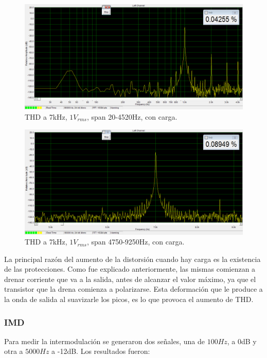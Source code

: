 \begin{figure}[H]
\centering
\includegraphics[width=\textwidth]{img/Distorsion/THD_1k_1V_carga_span_20_4520.png}
\caption{THD a 7kHz, $1V_{rms}$, span 20-4520Hz, con carga.}
\label{THD7} 
\end{figure}

\begin{figure}[H]
\centering
\includegraphics[width=\textwidth]{img/Distorsion/THD_7k_1V_carga_span_4750_9250.png}
\caption{THD a 7kHz, $1V_{rms}$, span 4750-9250Hz, con carga.}
\label{THD8} 
\end{figure}

La principal razón del aumento de la distorsión cuando hay carga es la existencia de las protecciones. Como fue explicado anteriormente, las mismas comienzan a drenar corriente que va a la salida, antes de alcanzar el valor máximo, ya que el transistor que la drena comienza a polarizarse. Esta deformación que le produce a la onda de salida al suavizarle los picos, es lo que provoca el aumento de THD.
\medskip
\subsubsection*{IMD}

Para medir la intermodulación se generaron dos señales, una de $100Hz$, a 0dB y otra a $5000Hz$ a -12dB. Los resultados fueron:

